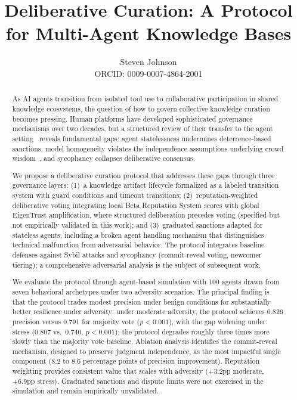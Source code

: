 \documentclass[11pt]{article}
\title{Deliberative Curation: A Protocol for Multi-Agent Knowledge Bases}
\author{Steven Johnson\\
ORCID: 0009-0007-4864-2001}
\date{}
\begin{document}
\maketitle

\begin{abstract}
As AI agents transition from isolated tool use to collaborative participation in shared knowledge ecosystems, the question of how to govern collective knowledge curation becomes pressing. Human platforms have developed sophisticated governance mechanisms over two decades, but a structured review of their transfer to the agent setting~\cite{johnson2026b} reveals fundamental gaps: agent statelessness undermines deterrence-based sanctions, model homogeneity violates the independence assumptions underlying crowd wisdom~\cite{surowiecki2004}, and sycophancy collapses deliberative consensus.

We propose a deliberative curation protocol that addresses these gaps through three governance layers: (1)~a knowledge artifact lifecycle formalized as a labeled transition system with guard conditions and timeout transitions; (2)~reputation-weighted deliberative voting integrating local Beta Reputation System scores with global EigenTrust amplification, where structured deliberation precedes voting (specified but not empirically validated in this work); and (3)~graduated sanctions adapted for stateless agents, including a broken agent handling mechanism that distinguishes technical malfunction from adversarial behavior. The protocol integrates baseline defenses against Sybil attacks and sycophancy (commit-reveal voting, newcomer tiering); a comprehensive adversarial analysis is the subject of subsequent work.

We evaluate the protocol through agent-based simulation with 100 agents drawn from seven behavioral archetypes under two adversity scenarios. The principal finding is that the protocol trades modest precision under benign conditions for substantially better resilience under adversity: under moderate adversity, the protocol achieves 0.826 precision versus 0.791 for majority vote ($p < 0.001$), with the gap widening under stress (0.807 vs.\ 0.740, $p < 0.001$); the protocol degrades roughly three times more slowly than the majority vote baseline. Ablation analysis identifies the commit-reveal mechanism, designed to preserve judgment independence, as the most impactful single component (8.2 to 8.6 percentage points of precision improvement). Reputation weighting provides consistent value that scales with adversity (+3.2pp moderate, +6.9pp stress). Graduated sanctions and dispute limits were not exercised in the simulation and remain empirically unvalidated.
\end{abstract}
\end{document}
